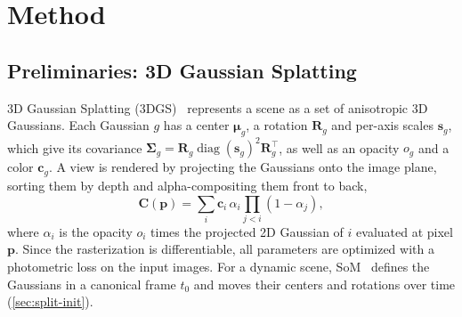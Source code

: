 \section{Method}
\label{sec:method}

% 
% 

\subsection{Preliminaries: 3D Gaussian Splatting}
\label{sec:prelim}
3D Gaussian Splatting (3DGS)~\cite{kerbl20233d} represents a scene as a set of anisotropic 3D Gaussians.
Each Gaussian $g$ has a center $\boldsymbol{\mu}_g$, a rotation $\mathbf{R}_g$ and per-axis scales $\mathbf{s}_g$, which give its covariance $\boldsymbol{\Sigma}_g = \mathbf{R}_g \operatorname{diag}(\mathbf{s}_g)^2 \mathbf{R}_g^\top$, as well as an opacity $o_g$ and a color $\mathbf{c}_g$.
A view is rendered by projecting the Gaussians onto the image plane, sorting them by depth and alpha-compositing them front to back,
\begin{equation}
  \mathbf{C}(\mathbf{p}) = \sum_{i} \mathbf{c}_i\, \alpha_i \prod_{j<i} (1 - \alpha_j) ,
  \label{eq:3dgs}
\end{equation}
where $\alpha_i$ is the opacity $o_i$ times the projected 2D Gaussian of $i$ evaluated at pixel $\mathbf{p}$.
Since the rasterization is differentiable, all parameters are optimized with a photometric loss on the input images.
For a dynamic scene, SoM~\cite{wang2025shape} defines the Gaussians in a canonical frame $t_0$ and moves their centers and rotations over time (\cref{sec:split-init}).

% 

